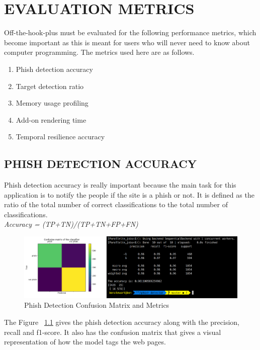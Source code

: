 
\chapter{EVALUATION METRICS} %
Off-the-hook-plus must be evaluated  for the following performance metrics, which become important as this is meant for users who will never need to know about computer programming. The metrics used here are as follows.

\begin{enumerate}
    \item Phish detection accuracy
    \item Target detection ratio
    \item Memory usage profiling
    \item Add-on rendering time
    \item Temporal resilience accuracy
\end{enumerate}

\section{PHISH DETECTION ACCURACY}
Phish detection accuracy is really important because the main task for this application is to notify the people if the site is a phish or not. It is defined as the ratio of the total number of correct classifications to the total number of classifications.\\
\null\quad\textit{Accuracy = (TP+TN)/(TP+TN+FP+FN)}\\

\begin{figure}[htp]
\centering
\includegraphics[scale=0.2]{Figures/image1.png}
\caption{Phish Detection Confusion Matrix and Metrics}
\label{fig:pdcmm}
\end{figure}

The Figure ~\ref{fig:pdcmm} gives the phish detection accuracy along with the precision, recall and f1-score. It also has the confusion matrix that gives a visual representation of how the model tags the web pages.

